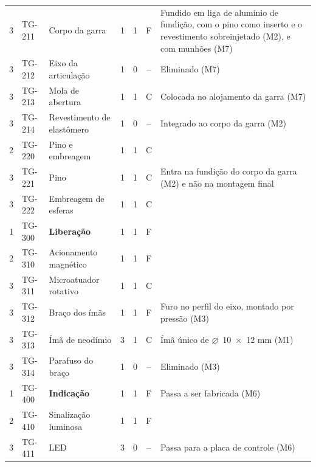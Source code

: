 \begin{longtable}{@{}c l >{\RaggedRight\arraybackslash}p{4.2cm} c c c >{\RaggedRight\arraybackslash}p{4.2cm}@{}}
    3 & TG-211 & \hspace{0.6cm}Corpo da garra & 1 & 1 & F & Fundido em liga de alumínio de fundição, com o pino como inserto e o revestimento sobreinjetado (M2), e com munhões (M7) \\
    3 & TG-212 & \hspace{0.6cm}Eixo da articulação & 1 & 0 & -- & Eliminado (M7) \\
    3 & TG-213 & \hspace{0.6cm}Mola de abertura & 1 & 1 & C & Colocada no alojamento da garra (M7) \\
    3 & TG-214 & \hspace{0.6cm}Revestimento de elastômero & 1 & 0 & -- & Integrado ao corpo da garra (M2) \\
    2 & TG-220 & \hspace{0.3cm}Pino e embreagem & 1 & 1 & C & \\
    3 & TG-221 & \hspace{0.6cm}Pino & 1 & 1 & C & Entra na fundição do corpo da garra (M2) e não na montagem final \\
    3 & TG-222 & \hspace{0.6cm}Embreagem de esferas & 1 & 1 & C & \\
    \midrule
    1 & TG-300 & \textbf{Liberação} & 1 & 1 & F & \\
    2 & TG-310 & \hspace{0.3cm}Acionamento magnético & 1 & 1 & F & \\
    3 & TG-311 & \hspace{0.6cm}Microatuador rotativo & 1 & 1 & C & \\
    3 & TG-312 & \hspace{0.6cm}Braço dos ímãs & 1 & 1 & F & Furo no perfil do eixo, montado por pressão (M3) \\
    3 & TG-313 & \hspace{0.6cm}Ímã de neodímio & 3 & 1 & C & Ímã único de $\varnothing$~10~$\times$~12 mm (M1) \\
    3 & TG-314 & \hspace{0.6cm}Parafuso do braço & 1 & 0 & -- & Eliminado (M3) \\
    \midrule
    1 & TG-400 & \textbf{Indicação} & 1 & 1 & F & Passa a ser fabricada (M6) \\
    2 & TG-410 & \hspace{0.3cm}Sinalização luminosa & 1 & 1 & F & \\
    3 & TG-411 & \hspace{0.6cm}LED & 3 & 0 & -- & Passa para a placa de controle (M6) \\

\end{longtable}
